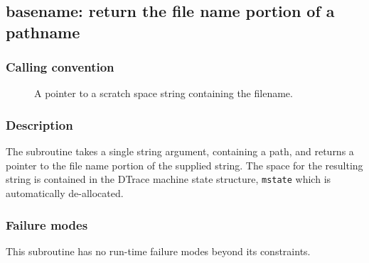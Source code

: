 \clearpage
{}
{}
\label{subr:basename}
\subsection*{basename: return the file name portion of a pathname}

\subsubsection*{Calling convention}

\begin{description}
\item[] A pointer to a scratch space string containing
  the filename.
\end{description}

\subsubsection*{Description}

The  subroutine takes a single string argument,
containing a path, and returns a pointer to the file name portion of
the supplied string.  The space for the resulting string is contained
in the DTrace machine state structure, \verb|mstate| which is
automatically de-allocated.

\subsubsection*{Failure modes}

This subroutine has no run-time failure modes beyond its constraints.
